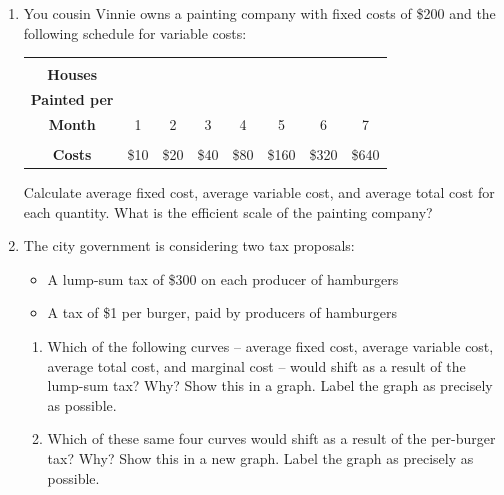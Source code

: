 \documentclass{article}
\begin{document}
\begin{enumerate}
\begin{enumerate}
	\end{enumerate}
	
\item You cousin Vinnie owns a painting company with fixed costs of \$200 and the following schedule for variable costs:

	\begin{center}
	\begin{tabular}{| c | c | c | c | c | c | c | c |}
	\hline
	\makecell{\textbf{Quantity of}\\\textbf{Houses}\\\textbf{Painted per}\\\textbf{Month}} & 1 & 2 & 3 & 4 & 5 & 6 & 7 \\
	\hline
	\makecell{\textbf{Variable}\\\textbf{Costs}} & \$10 & \$20 & \$40 & \$80 & \$160 & \$320 & \$640 \\
	\hline
	\end{tabular}
	\end{center}
	
	Calculate average fixed cost, average variable cost, and average total cost for each quantity. What is the efficient scale of the painting company? 
	
\item The city government is considering two tax proposals:

	\begin{itemize}
	
	\item A lump-sum tax of \$300 on each producer of hamburgers
	
	\item A tax of \$1 per burger, paid by producers of hamburgers
	
	\end{itemize}
	
	\begin{enumerate}
	
	\item Which of the following curves -- average fixed cost, average variable cost, average total cost, and marginal cost -- would shift as a result of the lump-sum tax? Why? Show this in a graph. Label the graph as precisely as possible.
	
	\item Which of these same four curves would shift as a result of the per-burger tax? Why? Show this in a new graph. Label the graph as precisely as possible.
	
	\end{enumerate}
	

\end{enumerate}
\end{document}
